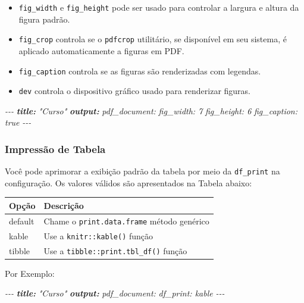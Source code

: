 \documentclass[
]{book}
\newenvironment{Shaded}{\begin{snugshade}}{\end{snugshade}}
\newcommand{\AnnotationTok}[1]{\textcolor[rgb]{0.56,0.35,0.01}{\textbf{\textit{#1}}}}
\newcommand{\CommentTok}[1]{\textcolor[rgb]{0.56,0.35,0.01}{\textit{#1}}}
\begin{document}
\begin{itemize}
\item
  \texttt{fig\_width} e \texttt{fig\_height} pode ser usado para controlar a largura e altura da figura padrão.
\item
  \texttt{fig\_crop} controla se o \texttt{pdfcrop} utilitário, se disponível em seu sistema, é aplicado automaticamente a figuras em PDF.
\item
  \texttt{fig\_caption} controla se as figuras são renderizadas com legendas.
\item
  \texttt{dev} controla o dispositivo gráfico usado para renderizar figuras.
\end{itemize}

\begin{Shaded}
\begin{Highlighting}[]
\CommentTok{{-}{-}{-}}
\AnnotationTok{title:}\CommentTok{ "Curso"}
\AnnotationTok{output:}
\CommentTok{  pdf\_document:}
\CommentTok{    fig\_width: 7}
\CommentTok{    fig\_height: 6}
\CommentTok{    fig\_caption: true}
\CommentTok{{-}{-}{-}}
\end{Highlighting}
\end{Shaded}

\hypertarget{impressuxe3o-de-tabela}{%
\subsubsection{Impressão de Tabela}\label{impressuxe3o-de-tabela}}

Você pode aprimorar a exibição padrão da tabela por meio da \texttt{df\_print} na configuração. Os valores válidos são apresentados na Tabela abaixo:

\begin{longtable}[]{@{}ll@{}}
\toprule
Opção & Descrição\tabularnewline
\midrule
\endhead
default & Chame o \texttt{print.data.frame} método genérico\tabularnewline
kable & Use a \texttt{knitr::kable()} função\tabularnewline
tibble & Use a \texttt{tibble::print.tbl\_df()} função\tabularnewline
\bottomrule
\end{longtable}

Por Exemplo:

\begin{Shaded}
\begin{Highlighting}[]
\CommentTok{{-}{-}{-}}
\AnnotationTok{title:}\CommentTok{ "Curso"}
\AnnotationTok{output:}
\CommentTok{  pdf\_document:}
\CommentTok{    df\_print: kable}
\CommentTok{{-}{-}{-}}
\end{Highlighting}
\end{Shaded}
\end{document}
